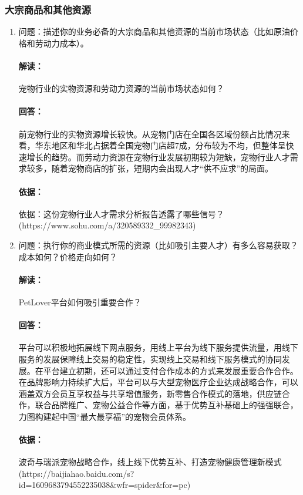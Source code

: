 \documentclass[a4paper]{ctexart}
\begin{document}
\subsubsection{大宗商品和其他资源}
\begin{enumerate}[label=\alph*.]
  \item 问题：描述你的业务必备的大宗商品和其他资源的当前市场状态（比如原油价格和劳动力成本）。
  \paragraph{解读：}宠物行业的实物资源和劳动力资源的当前市场状态如何？
  \paragraph{回答：}前宠物行业的实物资源增长较快。从宠物门店在全国各区域份额占比情况来看，华东地区和华北占据着全国宠物门店超7成，分布较为不均，但整体呈快速增长的趋势。而劳动力资源在宠物行业发展初期较为短缺，宠物行业人才需求较多，随着宠物商店的扩张，短期内会出现人才“供不应求”的局面。
  \paragraph{依据：}依据：这份宠物行业人才需求分析报告透露了哪些信号？\\(https://www.sohu.com/a/320589332\_99982343)
  \item 问题：执行你的商业模式所需的资源（比如吸引主要人才）有多么容易获取？成本如何？价格走向如何？
  \paragraph{解读：}PetLover平台如何吸引重要合作？
  \paragraph{回答：}平台可以积极地拓展线下网点服务，用线上平台为线下服务提供流量，用线下服务的发展保障线上交易的稳定性，实现线上交易和线下服务模式的协同发展。在平台建立初期，还可以通过支付合作成本的方式来发展重要合作合作。在品牌影响力持续扩大后，平台可以与大型宠物医疗企业达成战略合作，可以涵盖双方会员互享权益与共享增值服务，新零售合作模式的落地，供应链合作，联合品牌推广、宠物公益合作等方面，基于优势互补基础上的强强联合，力图构建起中国“最大最享福”的宠物会员体系。
  \paragraph{依据：}波奇与瑞派宠物战略合作，线上线下优势互补、打造宠物健康管理新模式\\ (https://baijiahao.baidu.com/s?id=1609683794552235038\&wfr=spider\&for=pc)
\end{enumerate}
\end{document}
